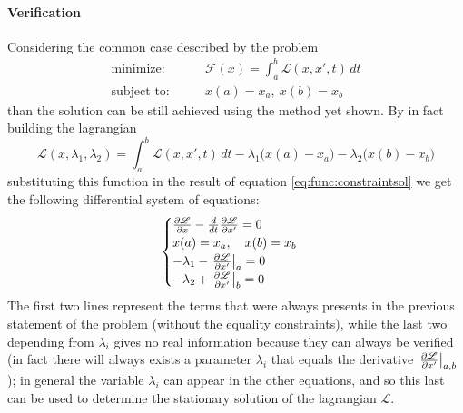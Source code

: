 	\paragraph{Verification} Considering the common case described by the problem
	\begin{align*} 
		\textrm{minimize:}& \qquad \mathcal F(x) = \int_a^b \mathcal L(x,x',t)\, dt \\
		\textrm{subject to:}& \qquad x(a) = x_a, \ x(b) = x_b
	\end{align*}
	than the solution can be still achieved using the method yet shown. By in fact building the lagrangian 
	\[ \mathscr L (x,\lambda_1,\lambda_2) = \int_a^b \mathcal L(x,x',t)\, dt - \lambda_1\big(x(a)-x_a\big) -\lambda_2 \big(x(b) - x_b \big) \]
	substituting this function in the result of equation \ref{eq:func:constraintsol} we get the following differential system of equations:
	\[ \begin{cases}
		\frac{\partial \mathscr L}{\partial x} - \frac d {dt}\frac{\partial \mathscr L}{\partial x'} = 0 \\
		x(a) = x_a, \quad x(b) = x_b\\ 
		-\lambda_1 - \left. \frac{\partial \mathscr L}{\partial x'} \right|_a = 0 \\
		-\lambda_2 + \left. \frac{\partial \mathscr L}{\partial x'} \right|_b = 0 \\
	\end{cases} \]
	The first two lines represent the terms that were always presents in the previous statement of the problem (without the equality constraints), while the last two depending from $\lambda_i$ gives no real information because they can always be verified (in fact there will always exists a parameter $\lambda_i$  that equals the derivative $\left. \frac{\partial \mathscr L}{\partial x'}\right|_{a,b}$); in general the variable $\lambda_i$ can appear in the other equations, and so this last can be used to determine the stationary solution of the lagrangian $\mathscr L$.
	
	
	
	
	
	
	
	
	
	
	
	
	
	
	
	
	
	
	
	
	
	
	
	
	
	
	
	
	
	
	
	